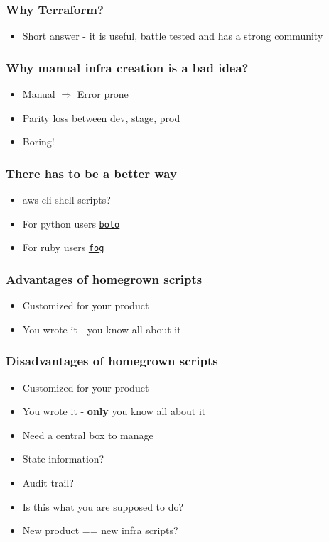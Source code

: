 \documentclass[9pt]{beamer}
\newcommand{\myblue} [1] {{\color{blue}#1}}
\begin{document}
\begin{frame}[fragile]
  \frametitle{Why Terraform?}

  \begin{itemize}
    \item Short answer - it is useful, battle tested and has a strong community
  \end{itemize}
\end{frame}


\begin{frame}[fragile]
  \frametitle{Why manual infra creation is a bad idea?}

  \begin{itemize}[<+->]
    \item Manual $\Rightarrow$ Error prone
    \item Parity loss between dev, stage, prod
    \item Boring!
  \end{itemize}

\end{frame}

\begin{frame}[fragile]
  \frametitle{There has to be a better way}

  \begin{itemize}[<+->]
    \item aws cli shell scripts?
    \item For python users \myblue{\href{https://github.com/boto/boto}{\texttt{boto}}}
    \item For ruby users \myblue{\href{https://github.com/fog/fog}{\texttt{fog}}}
  \end{itemize}

\end{frame}

\begin{frame}[fragile]
  \frametitle{Advantages of homegrown scripts}

  \begin{itemize}[<+->]
    \item Customized for your product
    \item You wrote it - you know all about it
  \end{itemize}

\end{frame}

\begin{frame}[fragile]
  \frametitle{Disadvantages of homegrown scripts}

  \begin{itemize}[<+->]
    \item Customized for your product
    \item You wrote it - \textbf{only} you know all about it
    \item Need a central box to manage
    \item State information?
    \item Audit trail?
    \item Is this what you are supposed to do?
    \item New product == new infra scripts?
  \end{itemize}

\end{frame}
\end{document}
